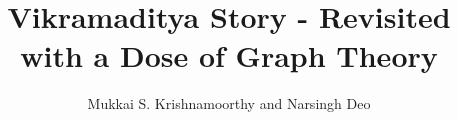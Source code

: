 \documentclass[book,12pt,oneside,openany]{memoir}
\title{Vikramaditya Story - Revisited with a Dose of Graph Theory}
\author{Mukkai S. Krishnamoorthy and Narsingh Deo}
\begin{document}
\maketitle
\begin{newpage}

\tableofcontents
\end{newpage}


























\end{document}
